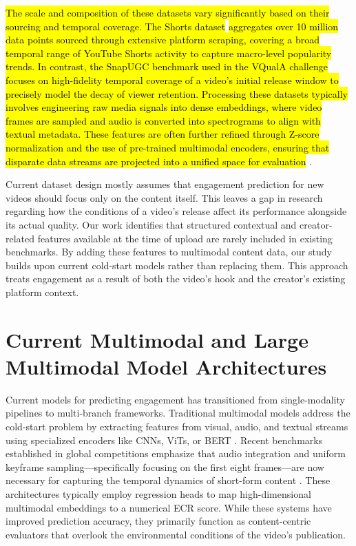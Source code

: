 \hl{The scale and composition of these datasets vary significantly based on their sourcing and temporal coverage. The Shorts dataset} \cite{violot2024shorts} \hl{aggregates over 10 million data points sourced through extensive platform scraping, covering a broad temporal range of YouTube Shorts activity to capture macro-level popularity trends. In contrast, the SnapUGC benchmark used in the VQualA challenge} \cite{li2025vquala} \hl{focuses on high-fidelity temporal coverage of a video's initial release window to precisely model the decay of viewer retention. Processing these datasets typically involves engineering raw media signals into dense embeddings, where video frames are sampled and audio is converted into spectrograms to align with textual metadata. These features are often further refined through Z-score normalization and the use of pre-trained multimodal encoders, ensuring that disparate data streams are projected into a unified space for evaluation} \cite{li2024delving, violot2024shorts}.

Current dataset design mostly assumes that engagement prediction for new videos should focus only on the content itself. This leaves a gap in research regarding how the conditions of a video's release affect its performance alongside its actual quality. Our work identifies that structured contextual and creator-related features available at the time of upload are rarely included in existing benchmarks. By adding these features to multimodal content data, our study builds upon current cold-start models rather than replacing them. This approach treats engagement as a result of both the video's hook and the creator's existing platform context.


\section{Current Multimodal and Large Multimodal Model Architectures}

Current models for predicting engagement has transitioned from single-modality pipelines to multi-branch frameworks. Traditional multimodal models address the cold-start problem by extracting features from visual, audio, and textual streams using specialized encoders like CNNs, ViTs, or BERT \cite{cho2024amps, guan2025mmf}. Recent benchmarks established in global competitions emphasize that audio integration and uniform keyframe sampling—specifically focusing on the first eight frames—are now necessary for capturing the temporal dynamics of short-form content \cite{li2025vquala, sun2025engagement}. These architectures typically employ regression heads to map high-dimensional multimodal embeddings to a numerical ECR score. While these systems have improved prediction accuracy, they primarily function as content-centric evaluators that overlook the environmental conditions of the video's publication.

